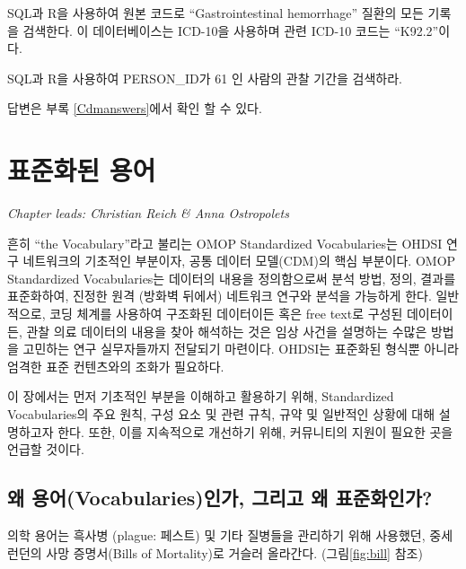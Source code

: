 \documentclass[11pt]{book}
\theoremstyle{definition}
\theoremstyle{definition}
\theoremstyle{definition}
\theoremstyle{remark}
\let\BeginKnitrBlock\begin \let\EndKnitrBlock\end
\begin{document}
\BeginKnitrBlock{exercise}
\protect\hypertarget{exr:exercisePersonSource}{}{\label{exr:exercisePersonSource}
}SQL과 R을 사용하여 원본 코드로 ``Gastrointestinal hemorrhage'' 질환의
모든 기록을 검색한다. 이 데이터베이스는 ICD-10을 사용하며 관련 ICD-10
코드는 ``K92.2''이다.
\EndKnitrBlock{exercise}

\BeginKnitrBlock{exercise}
\protect\hypertarget{exr:exercisePerson61Records}{}{\label{exr:exercisePerson61Records}
}SQL과 R을 사용하여 PERSON\_ID가 61 인 사람의 관찰 기간을 검색하라.
\EndKnitrBlock{exercise}

답변은 부록 \ref{Cdmanswers}에서 확인 할 수 있다.

\chapter{표준화된 용어}\label{StandardizedVocabularies}


\emph{Chapter leads: Christian Reich \& Anna Ostropolets}

흔히 ``the Vocabulary''라고 불리는 OMOP Standardized Vocabularies는
OHDSI 연구 네트워크의 기초적인 부분이자, 공통 데이터 모델(CDM)의 핵심
부분이다. OMOP Standardized Vocabularies는 데이터의 내용을 정의함으로써
분석 방법, 정의, 결과를 표준화하여, 진정한 원격 (방화벽 뒤에서) 네트워크
연구와 분석을 가능하게 한다. 일반적으로, 코딩 체계를 사용하여 구조화된
데이터이든 혹은 free text로 구성된 데이터이든, 관찰 의료 데이터의 내용을
찾아 해석하는 것은 임상 사건을 설명하는 수많은 방법을 고민하는 연구
실무자들까지 전달되기 마련이다. OHDSI는 표준화된 형식뿐 아니라 엄격한
표준 컨텐츠와의 조화가 필요하다.

이 장에서는 먼저 기초적인 부분을 이해하고 활용하기 위해, Standardized
Vocabularies의 주요 원칙, 구성 요소 및 관련 규칙, 규약 및 일반적인
상황에 대해 설명하고자 한다. 또한, 이를 지속적으로 개선하기 위해,
커뮤니티의 지원이 필요한 곳을 언급할 것이다.

\section{왜 용어(Vocabularies)인가, 그리고 왜
표준화인가?}\label{-vocabularies---}

의학 용어는 흑사병 (plague: 페스트) 및 기타 질병들을 관리하기 위해
사용했던, 중세 런던의 사망 증명서(Bills of Mortality)로 거슬러 올라간다.
(그림\ref{fig:bill} 참조) 
\end{document}
